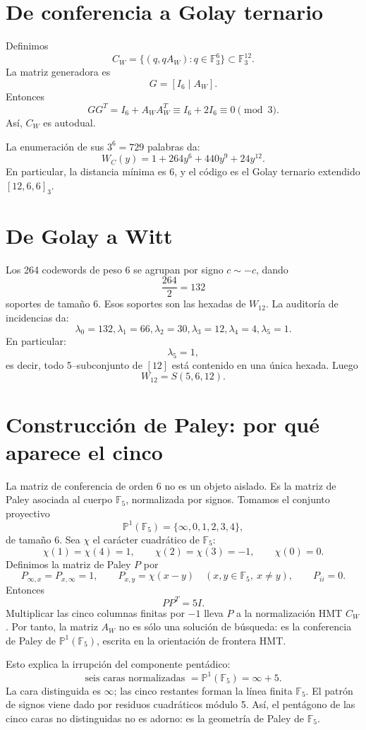 \documentclass[11pt,a4paper]{article}
\newcommand{\F}{\mathbb F}
\newcommand{\PP}{\mathbb P}
\begin{document}
\section{De conferencia a Golay ternario}
Definimos
\[
C_W=\{(q,qA_W):q\in\F_3^6\}\subset\F_3^{12}.
\]
La matriz generadora es
\[
G=[I_6\mid A_W].
\]
Entonces
\[
GG^T=I_6+A_WA_W^T\equiv I_6+2I_6\equiv0\pmod3.
\]
Así, \(C_W\) es autodual.

La enumeración de sus \(3^6=729\) palabras da:
\[
\boxed{W_C(y)=1+264y^6+440y^9+24y^{12}.}
\]
En particular, la distancia mínima es 6, y el código es el Golay ternario extendido \([12,6,6]_3\).

\section{De Golay a Witt}
Los 264 codewords de peso 6 se agrupan por signo \(c\sim -c\), dando
\[
\frac{264}{2}=132
\]
soportes de tamaño 6. Esos soportes son las hexadas de \(W_{12}\). La auditoría de incidencias da:
\[
\lambda_0=132,
\lambda_1=66,
\lambda_2=30,
\lambda_3=12,
\lambda_4=4,
\lambda_5=1.
\]
En particular:
\[
\boxed{\lambda_5=1,}
\]
es decir, todo 5--subconjunto de \([12]\) está contenido en una única hexada. Luego
\[
\boxed{W_{12}=S(5,6,12).}
\]



\section{Construcción de Paley: por qué aparece el cinco}
La matriz de conferencia de orden 6 no es un objeto aislado. Es la matriz de Paley asociada al cuerpo \(\F_5\), normalizada por signos. Tomamos el conjunto proyectivo
\[
\PP^1(\F_5)=\{\infty,0,1,2,3,4\},
\]
de tamaño 6. Sea \(\chi\) el carácter cuadrático de \(\F_5\):
\[
\chi(1)=\chi(4)=1,
\qquad
\chi(2)=\chi(3)=-1,
\qquad
\chi(0)=0.
\]
Definimos la matriz de Paley \(P\) por
\[
P_{\infty,x}=P_{x,\infty}=1,
\qquad
P_{x,y}=\chi(x-y)\quad(x,y\in\F_5,\ x\ne y),
\qquad
P_{ii}=0.
\]
Entonces
\[
PP^T=5I.
\]
Multiplicar las cinco columnas finitas por \(-1\) lleva \(P\) a la normalización HMT \(C_W\). Por tanto, la matriz \(A_W\) no es sólo una solución de búsqueda: es la conferencia de Paley de \(\PP^1(\F_5)\), escrita en la orientación de frontera HMT.

Esto explica la irrupción del componente pentádico:
\[
\boxed{\text{seis caras normalizadas }=\PP^1(\F_5)=\infty+5.}
\]
La cara distinguida es \(\infty\); las cinco restantes forman la línea finita \(\F_5\). El patrón de signos viene dado por residuos cuadráticos módulo 5. Así, el pentágono de las cinco caras no distinguidas no es adorno: es la geometría de Paley de \(\F_5\).
\end{document}
